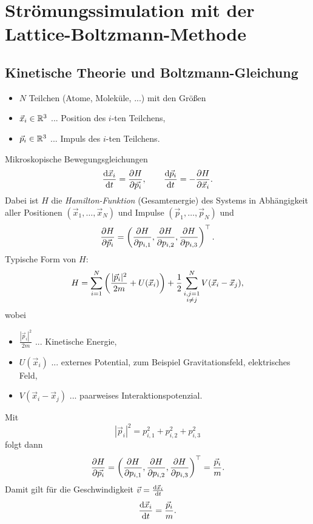 \chapter{Strömungssimulation mit der Lattice-Boltzmann-Methode}
\section{Kinetische Theorie und Boltzmann-Gleichung}
\begin{itemize}
\item $N$ Teilchen (Atome, Moleküle, ...) mit den Größen
\item  $\vec{x}_i \in \mathbb{R}^3$ ... Position des $i$-ten Teilchens,
\item $\vec{p}_i \in \mathbb{R}^3$ ... Impuls des $i$-ten Teilchens.
\end{itemize}

Mikroskopische Bewegungsgleichungen
\begin{equation}
 \frac{\mathrm{d} \vec{x}_i}{\mathrm{d} t} = \frac{\partial H}{\partial \vec{p_i}}, \qquad \frac{\mathrm{d} \vec{p}_i}{\mathrm{d} t} = -
  \frac{\partial H}{\partial \vec{x}_i}.
\end{equation}
Dabei ist $H$ die \emph{Hamilton-Funktion} (Gesamtenergie) des Systems in
Abhängigkeit aller Positionen $(\vec{x}_1, \ldots, \vec{x}_N)$ und Impulse $(\vec{p}_1, \ldots,
\vec{p}_N)$ und
\[ \frac{\partial H}{\partial \vec{p}_i} = \left( 
    \frac{\partial H}{\partial p_{i,1}}, \frac{\partial H}{\partial p_{i,2}}, \frac{\partial H}{\partial p_{i,3}}
   \right)^\top. \]
Typische Form von $H$:
\begin{equation}
  H = \sum_{i=1}^N \left( \frac{|\vec{p}_i|^2}{2m} + U(\vec{x}_i) \right)
  + \frac{1}{2} \sum_{\substack{i,j=1\\i \ne j}}^N V(\vec{x}_i - \vec{x}_j),
\end{equation}
wobei
\begin{itemize}
\item $\frac{|\vec{p}_i|^2}{2m}$ ... Kinetische Energie,
\item $U(\vec{x}_i)$ ... externes Potential, zum Beispiel Gravitationsfeld,
  elektrisches Feld,
\item $V(\vec{x}_i - \vec{x}_j)$ ... paarweises Interaktionspotenzial.
\end{itemize}

Mit 
\[ |\vec{p}_i|^2 = p_{i,1}^2 + p_{i,2}^2 + p_{i,3}^2 \]
folgt dann
\begin{equation}
  \frac{\partial H}{\partial \vec{p_i}} = \left( 
    \frac{\partial H}{\partial p_{i,1}}, \frac{\partial H}{\partial p_{i,2}}, \frac{\partial H}{\partial p_{i,3}}
  \right)^\top  = \frac{\vec{p}_i}{m}.
\end{equation}
Damit gilt für die Geschwindigkeit $\vec{v} = \frac{\mathrm{d} \vec{x}_i}{\mathrm{d} t}$
\begin{equation}
  \frac{\mathrm{d} \vec{x}_i}{\mathrm{d} t} = \frac{\vec{p}_i}{m}.
\end{equation}

